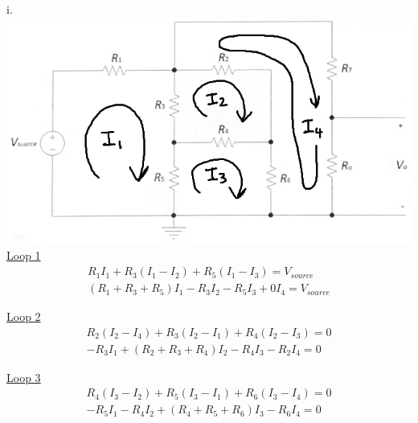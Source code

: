 \documentclass[12pt]{article}
\begin{document}
\thispagestyle{prelabheader}
i. \\
\includegraphics[width=\textwidth]{Circuit} \\

\underline{Loop 1}
\begin{equation}
    \begin{gathered}
        R_1I_1 + R_3(I_1-I_2) + R_5(I_1-I_3) = V_{source} \\
        (R_1 + R_3 + R_5)I_1 - R_3I_2 - R_5I_3 + 0I_4= V_{source}
    \end{gathered}
\end{equation}

\underline{Loop 2}
\begin{equation}
    \begin{gathered}
        R_2(I_2-I_4) + R_3(I_2-I_1) + R_4(I_2-I_3) = 0 \\
        -R_3I_1 + (R_2 + R_3 + R_4)I_2 - R_4I_3 - R_2I_4 = 0
    \end{gathered}
\end{equation}

\underline{Loop 3}
\begin{equation}
    \begin{gathered}
        R_4(I_3-I_2) + R_5(I_3-I_1) + R_6(I_3-I_4) = 0 \\
        -R_5I_1 - R_4I_2 + (R_4 + R_5 + R_6)I_3 - R_6I_4 = 0
    \end{gathered}
\end{equation}
\end{document}
